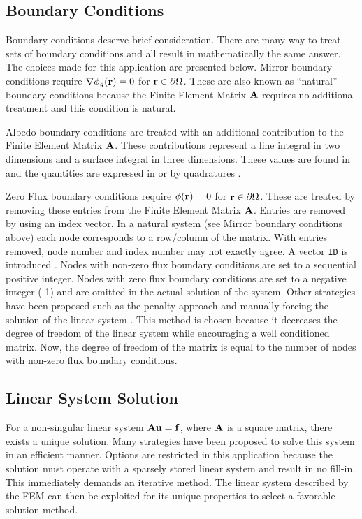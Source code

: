   \subsection{Boundary Conditions}
    Boundary conditions deserve brief consideration. There are many way to treat 
    sets of boundary conditions and all result in mathematically the same 
    answer. The choices made for this application are presented below. Mirror 
    boundary conditions require $\mathbf{\nabla} \phi_g(\mathbf{r}) = 0$ for 
    $\mathbf{r} \in \partial \Omega$. These are also known as ``natural'' boundary
    conditions because the Finite Element Matrix $\mathbf{A}$ requires no additional 
    treatment and this condition is natural.
    
    Albedo boundary conditions are treated with an additional contribution to 
    the Finite Element Matrix $\mathbf{A}$. These contributions represent a line 
    integral in two dimensions and a surface integral in three dimensions. These
    values are found in  and the quantities are 
    expressed in  or by quadratures 
    .
    
    Zero Flux boundary conditions require $\phi(\mathbf{r}) = 0$ for 
    $\mathbf{r} \in \partial \Omega$. These are treated by removing these entries from
    the Finite Element Matrix $\mathbf{A}$. Entries are removed by using an index 
    vector. In a natural system (see Mirror boundary conditions above) each node
    corresponds to a row/column of the matrix. With entries removed, node number
    and index number may not exactly agree. A vector \texttt{ID} is introduced
    \cite{textbookjohnson}. Nodes with non-zero flux boundary conditions are set
    to a sequential positive integer. Nodes with zero flux boundary conditions 
    are set to a negative integer (-1) and are omitted in the actual solution of 
    the system. Other strategies have been proposed such as the penalty approach 
    \cite{textbookhughes} and manually forcing the solution of the linear system 
    \cite{textbookli}. This method is chosen because it decreases the degree of 
    freedom of the linear system while encouraging a well conditioned matrix. 
    Now, the degree of freedom of the matrix is equal to the number of nodes 
    with non-zero flux boundary conditions.
    
  \subsection{Linear System Solution}
    For a non-singular linear system $\mathbf{A} \mathbf{u} = \mathbf{f}$, where $\mathbf{A}$ is a square 
    matrix, there exists a unique solution. Many strategies have been proposed 
    to solve this system in an efficient manner. Options are restricted in this
    application because the solution must operate with a sparsely stored linear 
    system and result in no fill-in. This immediately demands an iterative 
    method. The linear system described by the FEM can then be exploited for its 
    unique properties to select a favorable solution method.
    
